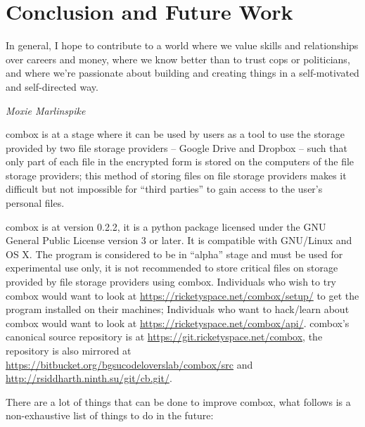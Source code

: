 \chapter{Conclusion and Future Work}\label{ch:5}

\epigraph{In general, I hope to contribute to a world where we value
  skills and relationships over careers and money, where we know
  better than to trust cops or politicians, and where we're passionate
  about building and creating things in a self-motivated and
  self-directed way.}{\textit{Moxie Marlinspike}}

combox is at a stage where it can be used by users as a tool to use
the storage provided by two file storage providers -- Google Drive and
Dropbox -- such that only part of each file in the encrypted form is
stored on the computers of the file storage providers; this method of
storing files on file storage providers makes it difficult but not
impossible for ``third parties'' to gain access to the user's personal
files.

combox is at version 0.2.2, it is a python package licensed under the
GNU General Public License version 3 or later. It is compatible with
GNU/Linux and OS X. The program is considered to be in ``alpha'' stage
and must be used for experimental use only, it is not recommended to
store critical files on storage provided by file storage providers
using combox. Individuals who wish to try combox would want to look at
\url{https://ricketyspace.net/combox/setup/} to get the program
installed on their machines; Individuals who want to hack/learn about
combox would want to look at
\url{https://ricketyspace.net/combox/api/}. combox's canonical source
repository is at \url{https://git.ricketyspace.net/combox}, the
repository is also mirrored at
\url{https://bitbucket.org/bgsucodeloverslab/combox/src} and
\url{http://rsiddharth.ninth.su/git/cb.git/}.

There are a lot of things that can be done to improve combox, what
follows is a non-exhaustive list of things to do in the future:

